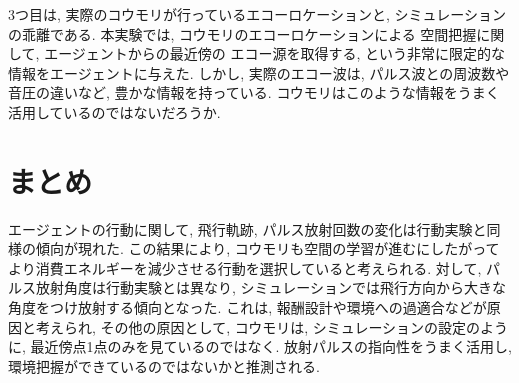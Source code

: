 \documentclass[../main]{subfiles}
\begin{document}
3つ目は, 実際のコウモリが行っているエコーロケーションと, 
シミュレーションの乖離である.
本実験では, コウモリのエコーロケーションによる
空間把握に関して, エージェントからの最近傍の
エコー源を取得する, という非常に限定的な情報をエージェントに与えた.
しかし, 実際のエコー波は, パルス波との周波数や音圧の違いなど, 
豊かな情報を持っている. 
コウモリはこのような情報をうまく活用しているのではないだろうか.


\section{まとめ}
エージェントの行動に関して, 飛行軌跡, 
パルス放射回数の変化は行動実験と同様の傾向が現れた.
この結果により,
コウモリも空間の学習が進むにしたがって
より消費エネルギーを減少させる行動を選択していると考えられる.
対して, パルス放射角度は行動実験とは異なり, 
シミュレーションでは飛行方向から大きな角度をつけ放射する傾向となった.
これは, 報酬設計や環境への過適合などが原因と考えられ, 
その他の原因として, コウモリは, シミュレーションの設定のように, 
最近傍点1点のみを見ているのではなく.
放射パルスの指向性をうまく活用し, 
環境把握ができているのではないかと推測される.

    
\end{document}
